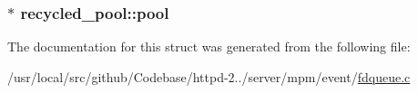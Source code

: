 \subsubsection[{\texorpdfstring{pool}{pool}}]{ $\ast$ recycled\+\_\+pool\+::pool}\hypertarget{structrecycled__pool_a7a9db88b8ae2ec367708d457b29e7d22}{}\label{structrecycled__pool_a7a9db88b8ae2ec367708d457b29e7d22}


The documentation for this struct was generated from the following file\+:\begin{DoxyCompactItemize}
\item 
/usr/local/src/github/\+Codebase/httpd-\/2../server/mpm/event/\hyperlink{event_2fdqueue_8c}{fdqueue.\+c}\end{DoxyCompactItemize}
